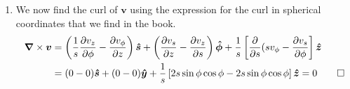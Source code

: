 \documentclass{homework}
\newcommand{\bs}[1]{\ensuremath{\boldsymbol{#1}}}
\newcommand{\bhat}[1]{\ensuremath{\boldsymbol{\hat{#1}}}}
\newcommand{\cross}[2]{\ensuremath{\boldsymbol{#1} \times \boldsymbol{#2}}}
\newcommand{\curl}[1]{\ensuremath{\cross{\nabla}{\bs{#1}}}}
\newcommand{\fracpd}[2]{
    \ensuremath{\frac{\partial #1}{\partial #2}}
  }
\begin{document}
\begin{homeworkProblem}[Problem 1.43]
{\begin{enumerate}
      \item We now find the curl of $\bs{v}$ using the expression for the curl in spherical coordinates that we find in the book.
        \begin{align*}
          \curl{v} &= \left(\frac{1}{s} \fracpd{v_z}{\phi}  - \fracpd{v_{\phi}}{z} \right) \bhat{s} + \left(\fracpd{v_s}{z} - \fracpd{v_z}{s} \right) \bhat{\phi} + \frac{1}{s} \left[ \fracpd{}{s} (s v_{\phi} - \fracpd{v_s}{\phi} \right] \bhat{z} \\
            &= (0 - 0) \bhat{s} + (0 - 0) \bhat{y} + \frac{1}{s} \left[ 2 s \sin\phi \cos\phi  - 2 s \sin\phi \cos\phi \right] \bhat{z}= 0 \qed
        \end{align*}
    \end{enumerate}
  }
\end{homeworkProblem}
\end{document}
